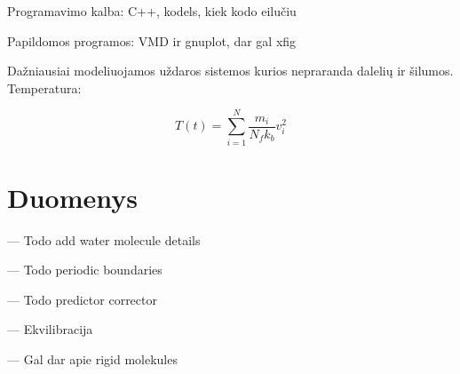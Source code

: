 Programavimo kalba: C++, kodels, kiek kodo eilučiu

Papildomos programos: VMD ir gnuplot, dar gal xfig

Dažniausiai modeliuojamos uždaros sistemos kurios nepraranda dalelių ir šilumos. Temperatura:

\begin{equation}
    T(t) = \sum\limits_{i=1}^N {\dfrac {m_i} {N_{f}k_{b}} v_i^2}
\end{equation}

\section{Duomenys}
\label{sec:data}

--- Todo add water molecule details

--- Todo periodic boundaries

--- Todo predictor corrector

--- Ekvilibracija

--- Gal dar apie rigid molekules

